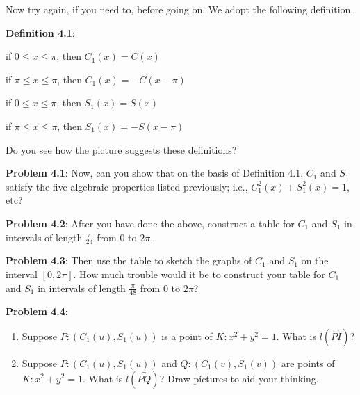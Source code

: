 \documentclass[english]{book}
\newcommand{\arc}[1]{\overset{\frown}{#1} }
\begin{document}
Now try again, if you need to, before going on. We adopt the following definition.

\vspace{0.3cm}

\textbf{Definition 4.1}:

\noindent if $0 \leq x \leq \pi$, then $C_{1}(x) = C(x)$ 

\noindent if $\pi \leq x \leq \pi$, then $C_{1}(x) = -C(x-\pi)$

\noindent if $0 \leq x \leq \pi$, then $S_{1}(x) = S(x)$ 

\noindent if $\pi \leq x \leq \pi$, then $S_{1}(x) = -S(x-\pi)$

Do you see how the picture suggests these definitions?

\vspace{0.3cm}

\textbf{Problem 4.1}: Now, can you show that on the basis of Definition 4.1, $C_{1}$ and $S_{1}$ satisfy the five algebraic properties listed previously; i.e., $C_{1}^{2}(x) + S_{1}^{2}(x) = 1$, etc?

\vspace{0.3cm}

\textbf{Problem 4.2}: After you have done the above, construct a table for $C_{1}$ and $S_{1}$ in intervals of length $\frac{\pi}{24}$ from $0$ to $2\pi$.

\vspace{0.3cm}

\textbf{Problem 4.3}: Then use the table to sketch the graphs of $C_{1}$ and $S_{1}$ on the interval $[0, 2\pi]$. How much trouble would it be to construct your table for $C_{1}$ and $S_{1}$ in intervals of length $\frac{\pi}{48}$ from $0$ to $2\pi$?

\vspace{0.3cm}

\textbf{Problem 4.4}:
\begin{enumerate}[\hspace{1cm}1)]
  \item Suppose $P:(C_{1}(u),S_{1}(u))$ is a point of $K:x^{2} + y^{2}= 1$. What is $l(\arc{PI})$?
  \item Suppose $P:(C_{1}(u),S_{1}(u))$ and $Q:(C_{1}(v),S_{1}(v))$ are points of $K:x^{2}+ y^{2} = 1$. What is $l(\arc{PQ})$? Draw pictures to aid your thinking.
\end{enumerate}
\end{document}
